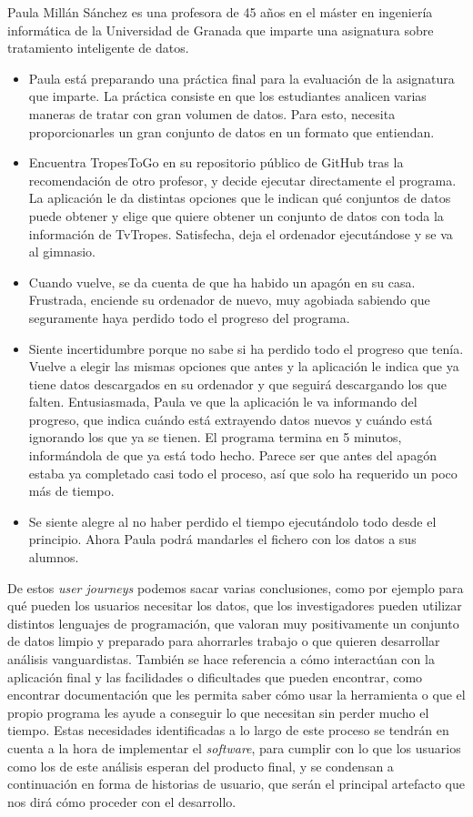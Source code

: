 Paula Millán Sánchez es una profesora de 45 años en el máster en ingeniería
informática de la Universidad de Granada que imparte una asignatura sobre
tratamiento inteligente de datos.

\begin{itemize}
    \item Paula está preparando una práctica final para la evaluación de la
    asignatura que imparte. La práctica consiste en que los estudiantes analicen
    varias maneras de tratar con gran volumen de datos. Para esto, necesita
    proporcionarles un gran conjunto de datos en un formato que entiendan.
    \item Encuentra TropesToGo en su repositorio público de GitHub tras la
    recomendación de otro profesor, y decide ejecutar directamente el programa.
    La aplicación le da distintas opciones que le indican qué conjuntos de datos
    puede obtener y elige que quiere obtener un conjunto de datos con toda la
    información de TvTropes. Satisfecha, deja el ordenador ejecutándose y se va
    al gimnasio.
    \item Cuando vuelve, se da cuenta de que ha habido un apagón en su casa.
    Frustrada, enciende su ordenador de nuevo, muy agobiada sabiendo que
    seguramente haya perdido todo el progreso del programa.
    \item Siente incertidumbre porque no sabe si ha perdido todo el progreso que
    tenía. Vuelve a elegir las mismas opciones que antes y la aplicación le
    indica que ya tiene datos descargados en su ordenador y que seguirá
    descargando los que falten. Entusiasmada, Paula ve que la aplicación le va
    informando del progreso, que indica cuándo está extrayendo datos nuevos y
    cuándo está ignorando los que ya se tienen. El programa termina en 5
    minutos, informándola de que ya está todo hecho. Parece ser que antes del
    apagón estaba ya completado casi todo el proceso, así que solo ha requerido
    un poco más de tiempo. 
    \item Se siente alegre al no haber perdido el tiempo ejecutándolo todo desde
    el principio. Ahora Paula podrá mandarles el fichero con los datos a sus
    alumnos.
\end{itemize}

De estos \textit{user journeys} podemos sacar varias conclusiones, como por
ejemplo para qué pueden los usuarios necesitar los datos, que los investigadores
pueden utilizar distintos lenguajes de programación, que valoran muy
positivamente un conjunto de datos limpio y preparado para ahorrarles trabajo o
que quieren desarrollar análisis vanguardistas. También se hace referencia a
cómo interactúan con la aplicación final y las facilidades o dificultades que
pueden encontrar, como encontrar documentación que les permita saber cómo usar
la herramienta o que el propio programa les ayude a conseguir lo que necesitan
sin perder mucho el tiempo. Estas necesidades identificadas a lo largo de este
proceso se tendrán en cuenta a la hora de implementar el \textit{software}, para
cumplir con lo que los usuarios como los de este análisis esperan del producto
final, y se condensan a continuación en forma de historias de usuario, que serán
el principal artefacto que nos dirá cómo proceder con el desarrollo.

